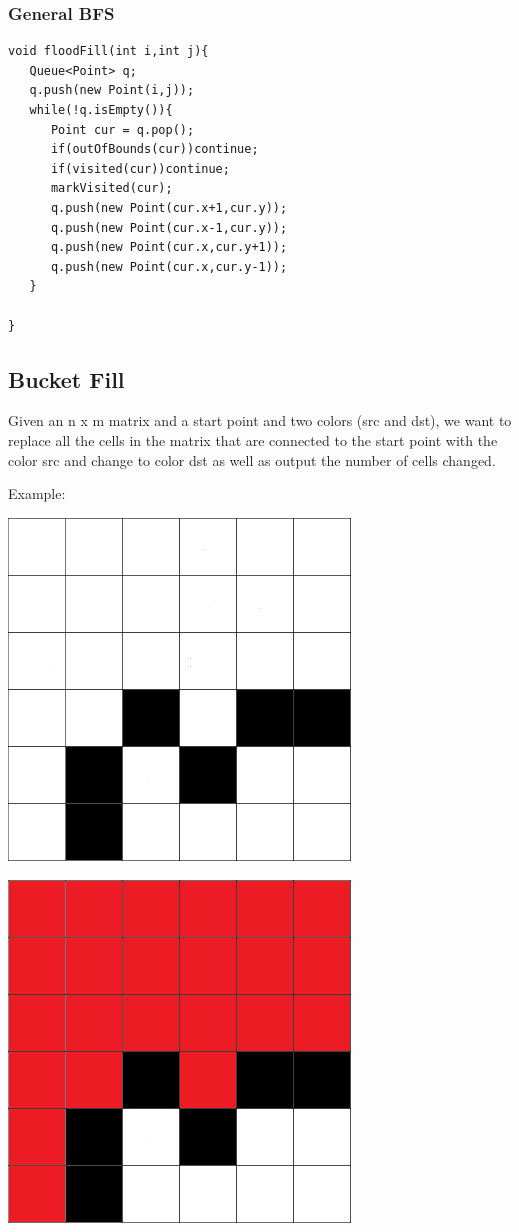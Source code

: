 \documentclass[11pt,oneside]{book}
\makeatletter
\def\maxwidth#1{\ifdim\Gin@nat@width>#1 #1\else\Gin@nat@width\fi}
\makeatother
\begin{document}
\subsubsection{General BFS}

\begin{lstlisting}
void floodFill(int i,int j){
   Queue<Point> q;
   q.push(new Point(i,j));
   while(!q.isEmpty()){
      Point cur = q.pop();
      if(outOfBounds(cur))continue;
      if(visited(cur))continue;
      markVisited(cur);
      q.push(new Point(cur.x+1,cur.y));
      q.push(new Point(cur.x-1,cur.y));
      q.push(new Point(cur.x,cur.y+1));
      q.push(new Point(cur.x,cur.y-1));
   }
   
}
\end{lstlisting}

\subsection{Bucket Fill}

Given an n x m matrix and a start point and two colors (src and dst), we want to replace all the cells in the matrix that are connected to the start point with the color src and change to color dst as well as output the number of cells changed.

Example:

\includegraphics[width=\maxwidth{\textwidth}]{bucket.png}

\includegraphics[width=\maxwidth{\textwidth}]{bucket2.png}
\end{document}
